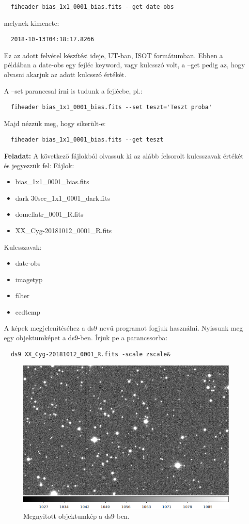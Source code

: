 \documentclass{article}
\begin{document}
\begin{verbatim}
  fiheader bias_1x1_0001_bias.fits --get date-obs
\end{verbatim}

melynek kimenete:
\begin{verbatim}
  2018-10-13T04:18:17.8266
\end{verbatim}

Ez az adott felvétel készítési ideje, UT-ban, ISOT formátumban.
Ebben a példában a date-obs egy fejléc keyword, vagy kulcsszó volt, a --get
pedig az, hogy olvasni akarjuk az adott kulcsszó értékét.

A --set paranccsal írni is tudunk a fejlécbe, pl.:
\begin{verbatim}
  fiheader bias_1x1_0001_bias.fits --set teszt='Teszt proba'
\end{verbatim}

Majd nézzük meg, hogy sikerült-e:
\begin{verbatim}
  fiheader bias_1x1_0001_bias.fits --get teszt
\end{verbatim}

{\bf Feladat:}
A következő fájlokból olvassuk ki az alább felsorolt kulcsszavak értékét és
jegyezzük fel:
Fájlok:
\begin{itemize}
  \item bias\_1x1\_0001\_bias.fits
  \item dark-30sec\_1x1\_0001\_dark.fits
  \item domeflatr\_0001\_R.fits
  \item XX\_Cyg-20181012\_0001\_R.fits
\end{itemize}
Kulcsszavak:
\begin{itemize}
  \item date-obs
  \item imagetyp
  \item filter
  \item ccdtemp
\end{itemize}


A képek megjelenítéséhez a ds9 nevű programot fogjuk használni.
Nyissunk meg egy objektumképet a ds9-ben. Írjuk pe a parancssorba:
\begin{verbatim}
  ds9 XX_Cyg-20181012_0001_R.fits -scale zscale&
\end{verbatim}

\begin{figure}
    \centering
    \includegraphics[width=0.8\linewidth]{pics/object.png}
    \caption{Megnyitott objektumkép a ds9-ben.}
    \label{objds9}
\end{figure}
\end{document}
